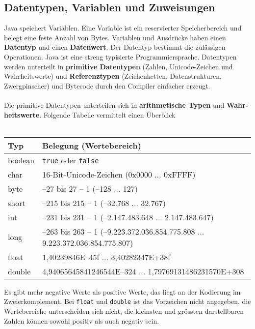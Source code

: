 \subsection{Datentypen, Variablen und Zuweisungen}
Java speichert Variablen. Eine Variable ist ein reservierter Speicherbereich und belegt eine feste Anzahl von Bytes. Variablen und Ausdrücke haben einen \textbf{Datentyp} und einen \textbf{Datenwert}. Der Datentyp bestimmt die zulässigen Operationen. Java ist eine streng typisierte Programmiersprache. Datentypen werden unterteilt in \textbf{primitive Datentypen} (Zahlen, Unicode-Zeichen und Wahrheitswerte) und \textbf{Referenztypen} (Zeichenketten, Datenstrukturen, Zwergpinscher) und Bytecode durch den Compiler einfacher erzeugt.
\\\\
Die primitive Datentypen unterteilen sich in \textbf{arithmetische Typen} und \textbf{Wahr-heitswerte}. Folgende Tabelle vermittelt einen Überblick
\\\\
\begin{tabular}{|l|l|}
\hline
Typ&Belegung (Wertebereich)\\\hline
boolean&\texttt{true} oder \texttt{false}\\
char& 16-Bit-Unicode-Zeichen (0x0000 ... 0xFFFF)\\
byte&–27 bis 27 – 1 (–128 ... 127)\\
short&–215 bis 215 – 1 (–32.768 ... 32.767)\\
int&–231 bis 231 – 1 (–2.147.483.648 ... 2.147.483.647)\\
long&–263 bis 263 – 1 (–9.223.372.036.854.775.808 ... 9.223.372.036.854.775.807)\\
float&1,40239846E–45f ... 3,40282347E+38f\\
double&4,94065645841246544E–324 ... 1,79769131486231570E+308\\\hline
\end{tabular}
\newline\newline
Es gibt mehr negative Werte als positive Werte, das liegt an der Kodierung im Zweierkomplement. Bei \texttt{float} und \texttt{double} ist das Vorzeichen nicht angegeben, die Wertebereiche unterscheiden sich nicht, die kleinsten und grössten darstellbaren Zahlen können sowohl positiv als auch negativ sein.

















